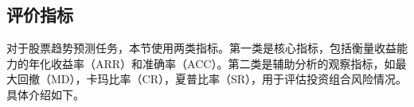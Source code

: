 
\subsection{评价指标}

对于股票趋势预测任务，本节使用两类指标。第一类是核心指标，包括衡量收益能力的年化收益率（ARR）和准确率（ACC）。第二类是辅助分析的观察指标，如最大回撤（MD），卡玛比率（CR），夏普比率（SR），用于评估投资组合风险情况。具体介绍如下。

